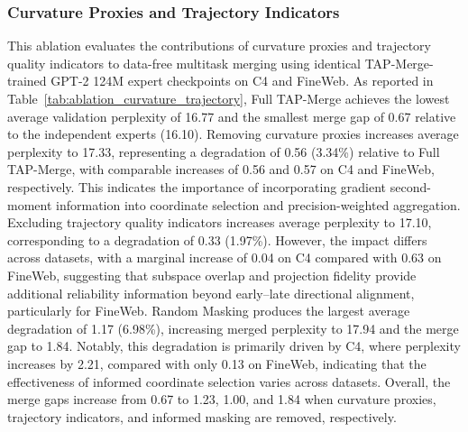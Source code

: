 \documentclass[fleqn,10pt]{wlscirep}
\begin{document}
\subsubsection{Curvature Proxies and Trajectory Indicators}
\label{subsec:ablation_curvature_trajectory}
This ablation evaluates the contributions of curvature proxies and trajectory quality indicators to data-free multitask merging using identical TAP-Merge-trained GPT-2 124M expert checkpoints on C4 and FineWeb. As reported in Table~\ref{tab:ablation_curvature_trajectory}, Full TAP-Merge achieves the lowest average validation perplexity of 16.77 and the smallest merge gap of 0.67 relative to the independent experts (16.10). Removing curvature proxies increases average perplexity to 17.33, representing a degradation of 0.56 (3.34\%) relative to Full TAP-Merge, with comparable increases of 0.56 and 0.57 on C4 and FineWeb, respectively. This indicates the importance of incorporating gradient second-moment information into coordinate selection and precision-weighted aggregation. Excluding trajectory quality indicators increases average perplexity to 17.10, corresponding to a degradation of 0.33 (1.97\%). However, the impact differs across datasets, with a marginal increase of 0.04 on C4 compared with 0.63 on FineWeb, suggesting that subspace overlap and projection fidelity provide additional reliability information beyond early--late directional alignment, particularly for FineWeb. Random Masking produces the largest average degradation of 1.17 (6.98\%), increasing merged perplexity to 17.94 and the merge gap to 1.84. Notably, this degradation is primarily driven by C4, where perplexity increases by 2.21, compared with only 0.13 on FineWeb, indicating that the effectiveness of informed coordinate selection varies across datasets. Overall, the merge gaps increase from 0.67 to 1.23, 1.00, and 1.84 when curvature proxies, trajectory indicators, and informed masking are removed, respectively.
\end{document}
